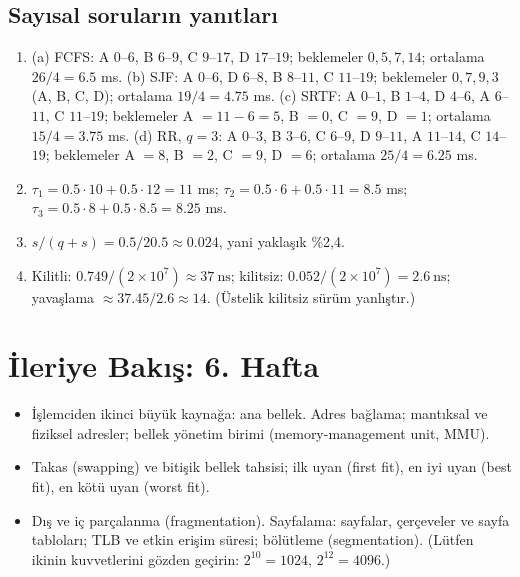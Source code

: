 \subsection*{Sayısal soruların yanıtları}
\begin{enumerate}[leftmargin=1.6em,start=9]
  \item (a) FCFS: A $0$--$6$, B $6$--$9$, C $9$--$17$, D $17$--$19$; beklemeler $0,5,7,14$; ortalama $26/4 = 6.5$ ms.
  (b) SJF: A $0$--$6$, D $6$--$8$, B $8$--$11$, C $11$--$19$; beklemeler $0,7,9,3$ (A, B, C, D); ortalama $19/4 = 4.75$ ms.
  (c) SRTF: A $0$--$1$, B $1$--$4$, D $4$--$6$, A $6$--$11$, C $11$--$19$; beklemeler A $=11-6=5$, B $=0$, C $=9$, D $=1$; ortalama $15/4 = 3.75$ ms.
  (d) RR, $q=3$: A $0$--$3$, B $3$--$6$, C $6$--$9$, D $9$--$11$, A $11$--$14$, C $14$--$19$; beklemeler A $=8$, B $=2$, C $=9$, D $=6$; ortalama $25/4 = 6.25$ ms.
  \item $\tau_1 = 0.5\cdot10 + 0.5\cdot12 = 11$ ms; $\tau_2 = 0.5\cdot6 + 0.5\cdot11 = 8.5$ ms; $\tau_3 = 0.5\cdot8 + 0.5\cdot8.5 = 8.25$ ms.
  \item $s/(q+s) = 0.5/20.5 \approx 0.024$, yani yaklaşık \%2,4.
  \item Kilitli: $0.749/(2\times10^{7}) \approx 37\ \text{ns}$; kilitsiz: $0.052/(2\times10^{7}) = 2.6\ \text{ns}$; yavaşlama $\approx 37.45/2.6 \approx 14$. (Üstelik kilitsiz sürüm yanlıştır.)
\end{enumerate}

\section{İleriye Bakış: 6. Hafta}

\begin{itemize}
  \item İşlemciden ikinci büyük kaynağa: ana bellek. Adres bağlama; mantıksal ve fiziksel adresler; bellek yönetim birimi (memory-management unit, MMU).
  \item Takas (swapping) ve bitişik bellek tahsisi; ilk uyan (first fit), en iyi uyan (best fit), en kötü uyan (worst fit).
  \item Dış ve iç parçalanma (fragmentation). Sayfalama: sayfalar, çerçeveler ve sayfa tabloları; TLB ve etkin erişim süresi; bölütleme (segmentation). (Lütfen ikinin kuvvetlerini gözden geçirin: $2^{10} = 1024$, $2^{12} = 4096$.)
\end{itemize}

